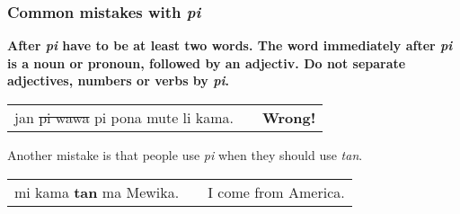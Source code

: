 % 
\label{'mistakes_with_pi'}
\subsubsection*{Common mistakes with \textit{pi}}
%
\textbf{After \textit{pi} have to be at least two words. 
The word immediately after \textit{pi} is a noun or pronoun, followed by an adjectiv.
Do not separate adjectives, numbers or verbs by \textit{pi}.}

\begin{supertabular}{p{5,5cm}|ll}
jan \sout{pi wawa} pi pona mute li kama. && \textbf{Wrong!} \\ %
\end{supertabular}

%
%
%
%
%
Another mistake is that people use \textit{pi} when they should use \textit{tan}. 

\begin{supertabular}{p{5,5cm}|ll}
mi kama \textbf{tan} ma Mewika. && I come from America. \\
\end{supertabular}  

